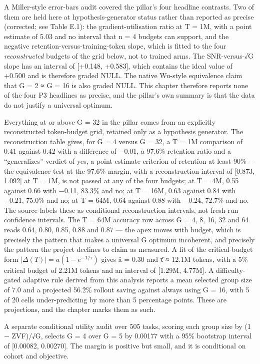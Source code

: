 \documentclass[12pt,a4paper]{report}
\begin{document}
A Miller-style \citep{miller2024errorbars} error-bars audit covered the
pillar's four headline contrasts. Two of them are held here at
hypothesis-generator status rather than reported as precise (corrected;
see Table E.1): the gradient-utilisation ratio at T = 1M, with a point
estimate of 5.03 and no interval that n = 4 budgets can support, and the
negative retention-versus-training-token slope, which is fitted to the
four \emph{reconstructed} budgets of the grid below, not to trained
arms. The SNR-versus-√G slope has an interval of {[}+0.148, +0.583{]},
which contains the ideal value of +0.500 and is therefore graded NULL.
The native Wu-style equivalence claim that G = 2 ≈ G = 16 is also graded
NULL. This chapter therefore reports none of the four P3 headlines as
precise, and the pillar's own summary is that the data do not justify a
universal optimum.

Everything at or above G = 32 in the pillar comes from an explicitly
reconstructed token-budget grid, retained only as a hypothesis
generator. The reconstruction table gives, for G = 4 versus G = 32, a T
= 1M comparison of 0.41 against 0.42 with a difference of −0.01, a
97.6\% retention ratio and a ``generalizes'' verdict of yes, a
point-estimate criterion of retention at least 90\% --- the equivalence
test at the 97.6\% margin, with a reconstruction interval of {[}0.873,
1.092{]} at T = 1M, is not passed at any of the four budgets; at T = 4M,
0.55 against 0.66 with −0.11, 83.3\% and no; at T = 16M, 0.63 against
0.84 with −0.21, 75.0\% and no; at T = 64M, 0.64 against 0.88 with
−0.24, 72.7\% and no. The source labels these as conditional
reconstruction intervals, not fresh-run confidence intervals. The T =
64M accuracy row across G = 4, 8, 16, 32 and 64 reads 0.64, 0.80, 0.85,
0.88 and 0.87 --- the apex moves with budget, which is precisely the
pattern that makes a universal G optimum incoherent, and precisely the
pattern the project declines to claim as measured. A fit of the
critical-budget form \(|\Delta(T)| = a(1 - e^{-T/\tau})\) gives â = 0.30
and τ̂ ≈ 12.1M tokens, with a 5\% critical budget of 2.21M tokens and an
interval of {[}1.29M, 4.77M{]}. A difficulty-gated adaptive rule derived
from this analysis reports a mean selected group size of 7.0 and a
projected 56.2\% rollout saving against always using G = 16, with 5 of
20 cells under-predicting by more than 5 percentage points. These are
projections, and the chapter marks them as such.

A separate conditional utility audit over 505 tasks, scoring each group
size by (1 − ZVF)/√G, selects G = 4 over G = 5 by 0.00177 with a 95\%
bootstrap interval of {[}0.00082, 0.00270{]}. The margin is positive but
small, and it is conditional on cohort and objective.
\end{document}
